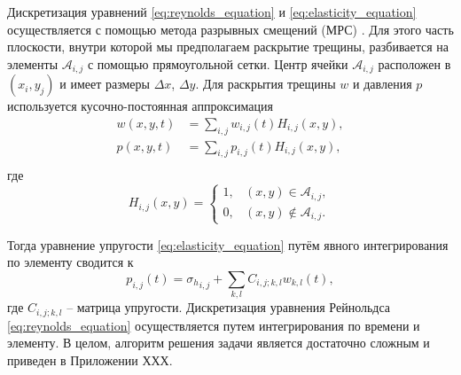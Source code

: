Дискретизация уравнений \eqref{eq:reynolds_equation} и \eqref{eq:elasticity_equation} осуществляется с помощью метода разрывных смещений (МРС) \cite{dispalecement_discontinuty_Crouch1983}. Для этого часть плоскости, внутри которой мы предполагаем раскрытие трещины, разбивается на элементы $\mathcal{A}_{i,j}$ с помощью прямоугольной сетки. Центр ячейки $\mathcal{A}_{i,j}$ расположен в $(x_i,y_j)$ и имеет размеры $\Delta x$, $\Delta y$. Для раскрытия трещины $w$ и давления $p$ используется кусочно-постоянная аппроксимация
\begin{equation}
    \label{eq:piecewiece_approximation}
    \begin{split}
        w(x,y,t) &= \sum\limits_{i,j} w_{i,j}(t) H_{i,j}(x,y), \\
        p(x,y,t) &= \sum\limits_{i,j} p_{i,j}(t) H_{i,j}(x,y), \\
    \end{split}
\end{equation}
где 
\begin{equation}
    \label{eq:heaviside_function}
    H_{i,j}(x,y) = \left\{
        \begin{array}{ll}
            1, & (x,y) \in \mathcal{A}_{i,j}, \\
            0, & (x,y) \notin \mathcal{A}_{i,j}.
        \end{array}\right.
\end{equation}

Тогда уравнение упругости \eqref{eq:elasticity_equation} путём явного интегрирования по элементу сводится к
\begin{equation}
    \label{eq:discrete_elasticity}
    p_{i,j}(t) = {\sigma_h}_{i,j} + \sum\limits_{k,l} C_{i,j;k,l} w_{k,l}(t),
\end{equation}
где $C_{i,j;k,l}$ -- матрица упругости. Дискретизация уравнения Рейнольдса \eqref{eq:reynolds_equation} осуществляется путем интегрирования по времени и элементу. В целом, алгоритм решения задачи \cite{DONTSOV201753} является достаточно сложным и приведен в Приложении ХХХ.